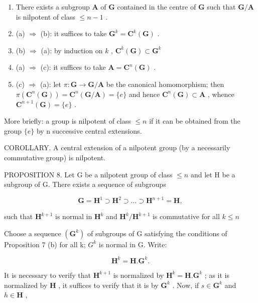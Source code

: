 \begin{enumerate}
\def\labelenumi{(\alph{enumi})}
\setcounter{enumi}{2}
\item
  There exists a subgroup \(\mathbf{A}\) of \(\mathbf{G}\) contained in the centre of \(\mathbf{G}\) such that \(\mathbf{G} / \mathbf{A}\) is nilpotent of class \(\leqslant n - 1\) .
\item
  (a) \(\Rightarrow\) (b): it suffices to take \(\mathbf{G}^k = \mathbf{C}^k (\mathbf{G})\) .
\item
  (b) \(\Rightarrow\) (a): by induction on \(k\) , \(\mathbf{C}^k (\mathbf{G})\subset \mathbf{G}^k\)
\item
  (a) \(\Rightarrow\) (c): it suffices to take \(\mathbf{A} = \mathbf{C}^n (\mathbf{G})\) .
\item
  (c) \(\Rightarrow\) (a): let \(\pi: \mathbf{G} \to \mathbf{G} / \mathbf{A}\) be the canonical homomorphism; then \(\pi(\mathbf{C}^n(\mathbf{G})) = \mathbf{C}^n(\mathbf{G} / \mathbf{A}) = \{e\}\) and hence \(\mathbf{C}^n(\mathbf{G}) \subset \mathbf{A}\) , whence \(\mathbf{C}^{n+1}(\mathbf{G}) = \{e\}\) .
\end{enumerate}

More briefly: a group is nilpotent of class \(\leqslant n\) if it can be obtained from the group \(\{e\}\) by n successive central extensions.

COROLLARY. A central extension of a nilpotent group (by a necessarily commutative group) is nilpotent.

PROPOSITION 8. Let G be a nilpotent group of class \(\leqslant n\) and let H be a subgroup of G. There exists a sequence of subgroups

\[
\mathbf {G} = \mathbf {H} ^ {1} \supset \mathbf {H} ^ {2} \supset \dots \supset \mathbf {H} ^ {n + 1} = \mathbf {H},
\]

such that \(\mathbf{H}^{k + 1}\) is normal in \(\mathbf{H}^k\) and \(\mathbf{H}^k /\mathbf{H}^{k + 1}\) is commutative for all \(k\leqslant n\)

Choose a sequence \((\mathbf{G}^{k})\) of subgroups of G satisfying the conditions of Proposition 7 (b) for all k; \(G^{k}\) is normal in G. Write:

\[
\mathbf {H} ^ {k} = \mathbf {H}. \mathbf {G} ^ {k}.
\]

It is necessary to verify that \(\mathbf{H}^{k + 1}\) is normalized by \(\mathbf{H}^k = \mathbf{H}.\mathbf{G}^k\) ; as it is normalized by \(\mathbf{H}\) , it suffices to verify that it is by \(\mathbf{G}^k\) . Now, if \(s\in \mathbf{G}^k\) and \(h\in \mathbf{H}\) ,

